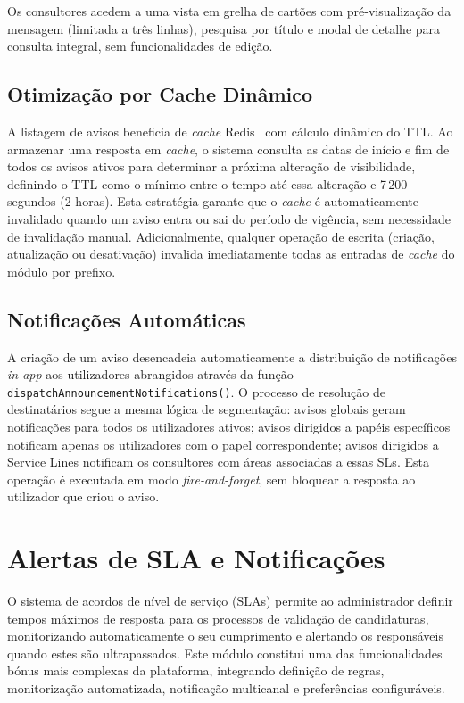 \documentclass[12pt,a4paper]{report}
\begin{document}
Os consultores acedem a uma vista em grelha de cartões com pré-visualização da mensagem (limitada a três linhas), pesquisa por título e modal de detalhe para consulta integral, sem funcionalidades de edição.

\subsection{Otimização por Cache Dinâmico}

A listagem de avisos beneficia de \textit{cache} Redis~\cite{redis} com cálculo dinâmico do TTL. Ao armazenar uma resposta em \textit{cache}, o sistema consulta as datas de início e fim de todos os avisos ativos para determinar a próxima alteração de visibilidade, definindo o TTL como o mínimo entre o tempo até essa alteração e 7\,200 segundos (2 horas). Esta estratégia garante que o \textit{cache} é automaticamente invalidado quando um aviso entra ou sai do período de vigência, sem necessidade de invalidação manual. Adicionalmente, qualquer operação de escrita (criação, atualização ou desativação) invalida imediatamente todas as entradas de \textit{cache} do módulo por prefixo.

\subsection{Notificações Automáticas}

A criação de um aviso desencadeia automaticamente a distribuição de notificações \textit{in-app} aos utilizadores abrangidos através da função \texttt{dispatchAnnouncementNotifications()}. O processo de resolução de destinatários segue a mesma lógica de segmentação: avisos globais geram notificações para todos os utilizadores ativos; avisos dirigidos a papéis específicos notificam apenas os utilizadores com o papel correspondente; avisos dirigidos a Service Lines notificam os consultores com áreas associadas a essas SLs. Esta operação é executada em modo \textit{fire-and-forget}, sem bloquear a resposta ao utilizador que criou o aviso.

\section{Alertas de SLA e Notificações}

O sistema de acordos de nível de serviço (SLAs) permite ao administrador definir tempos máximos de resposta para os processos de validação de candidaturas, monitorizando automaticamente o seu cumprimento e alertando os responsáveis quando estes são ultrapassados. Este módulo constitui uma das funcionalidades bónus mais complexas da plataforma, integrando definição de regras, monitorização automatizada, notificação multicanal e preferências configuráveis.
\end{document}
